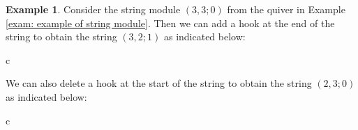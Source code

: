 \documentclass[12pt]{amsart}
\theoremstyle{plain}
\theoremstyle{definition}
\newtheorem{exmp}{Example}
    [section]
\theoremstyle{remark}
\begin{document}
{\color{black} 
\begin{exmp}\label{exmp: adding hooks}
    Consider the string module {\color{black}$(3,3;0)$} from {\color{black} the quiver in} Example \ref{exam: example of string module}. Then we can add a hook at the end of the string to obtain the string $(3,2;1)$ as indicated below:
\begin{center}
\begin{tabular}{c}
\end{tabular}	
\end{center}

We can also delete a hook at the start of the string to obtain the string $(2,3;0)$ as indicated below:

\begin{center}
\begin{tabular}{c}
\end{tabular}	
\end{center}
    
\end{exmp}
}
\end{document}
